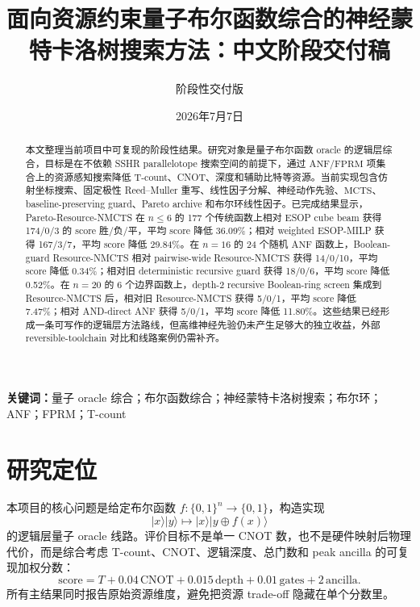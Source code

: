 \documentclass[UTF8,fontset=macnew,11pt]{ctexart}
\title{面向资源约束量子布尔函数综合的神经蒙特卡洛树搜索方法：中文阶段交付稿}
\author{阶段性交付版}
\date{2026年7月7日}
\newcommand{\method}{Resource-NMCTS}
\newcommand{\pareto}{Pareto-Resource-NMCTS}
\newcommand{\score}{\ensuremath{\mathrm{score}}}
\newcommand{\anf}{\ensuremath{\mathrm{ANF}}}
\newcommand{\fprm}{\ensuremath{\mathrm{FPRM}}}
\newcommand{\mcts}{\ensuremath{\mathrm{MCTS}}}
\begin{document}
\maketitle

\begin{abstract}
本文整理当前项目中可复现的阶段性结果。研究对象是量子布尔函数 oracle 的逻辑层综合，目标是在不依赖 SSHR parallelotope 搜索空间的前提下，通过 \anf{}/\fprm{} 项集合上的资源感知搜索降低 T-count、CNOT、深度和辅助比特等资源。当前实现包含仿射坐标搜索、固定极性 Reed--Muller 重写、线性因子分解、神经动作先验、\mcts{}、baseline-preserving guard、Pareto archive 和布尔环线性因子。已完成结果显示，\pareto{} 在 $n\leq6$ 的 177 个传统函数上相对 ESOP cube beam 获得 174/0/3 的 score 胜/负/平，平均 score 降低 36.09\%；相对 weighted ESOP-MILP 获得 167/3/7，平均 score 降低 29.84\%。在 $n=16$ 的 24 个随机 \anf{} 函数上，Boolean-guard \method{} 相对 pairwise-wide \method{} 获得 14/0/10，平均 score 降低 0.34\%；相对旧 deterministic recursive guard 获得 18/0/6，平均 score 降低 0.52\%。在 $n=20$ 的 6 个边界函数上，depth-2 recursive Boolean-ring screen 集成到 \method{} 后，相对旧 \method{} 获得 5/0/1，平均 score 降低 7.47\%；相对 AND-direct ANF 获得 5/0/1，平均 score 降低 11.80\%。这些结果已经形成一条可写作的逻辑层方法路线，但高维神经先验仍未产生足够大的独立收益，外部 reversible-toolchain 对比和线路案例仍需补齐。
\end{abstract}

\noindent\textbf{关键词：}量子 oracle 综合；布尔函数综合；神经蒙特卡洛树搜索；布尔环；ANF；FPRM；T-count

\section{研究定位}

本项目的核心问题是给定布尔函数 $f:\{0,1\}^n\rightarrow\{0,1\}$，构造实现
\begin{equation}
  |x\rangle |y\rangle \mapsto |x\rangle |y\oplus f(x)\rangle
  \label{eq:oracle}
\end{equation}
的逻辑层量子 oracle 线路。评价目标不是单一 CNOT 数，也不是硬件映射后物理代价，而是综合考虑 T-count、CNOT、逻辑深度、总门数和 peak ancilla 的可复现加权分数：
\begin{equation}
  \score = T + 0.04\,\mathrm{CNOT} + 0.015\,\mathrm{depth}
         + 0.01\,\mathrm{gates} + 2\,\mathrm{ancilla}.
  \label{eq:score}
\end{equation}
所有主结果同时报告原始资源维度，避免把资源 trade-off 隐藏在单个分数里。
\end{document}
